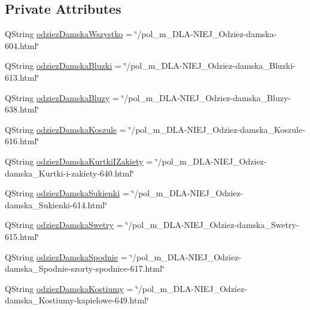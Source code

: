 \subsection*{Private Attributes}
\begin{DoxyCompactItemize}
\item 
Q\+String \mbox{\hyperlink{classdownload_product_af044eff03d0253442f16919758e3b9d8}{odziez\+Damska\+Wszystko}} = \char`\"{}/pol\+\_\+m\+\_\+\+D\+LA-\/N\+I\+E\+J\+\_\+\+Odziez-\/damska-\/604.html\char`\"{}
\item 
Q\+String \mbox{\hyperlink{classdownload_product_a42bef234920f4daa39ad5b69589f8de4}{odziez\+Damska\+Bluzki}} = \char`\"{}/pol\+\_\+m\+\_\+\+D\+LA-\/N\+I\+E\+J\+\_\+\+Odziez-\/damska\+\_\+\+Bluzki-\/613.html\char`\"{}
\item 
Q\+String \mbox{\hyperlink{classdownload_product_a92a6dad967a568583490ff60825ab1da}{odziez\+Damska\+Bluzy}} = \char`\"{}/pol\+\_\+m\+\_\+\+D\+LA-\/N\+I\+E\+J\+\_\+\+Odziez-\/damska\+\_\+\+Bluzy-\/638.html\char`\"{}
\item 
Q\+String \mbox{\hyperlink{classdownload_product_ae0b925c7625632a8797d277013e62582}{odziez\+Damska\+Koszule}} = \char`\"{}/pol\+\_\+m\+\_\+\+D\+LA-\/N\+I\+E\+J\+\_\+\+Odziez-\/damska\+\_\+\+Koszule-\/616.html\char`\"{}
\item 
Q\+String \mbox{\hyperlink{classdownload_product_ab108a4adb7e4dd8f0c39209ef836054a}{odziez\+Damska\+Kurtki\+I\+Zakiety}} = \char`\"{}/pol\+\_\+m\+\_\+\+D\+LA-\/N\+I\+E\+J\+\_\+\+Odziez-\/damska\+\_\+\+Kurtki-\/i-\/zakiety-\/640.html\char`\"{}
\item 
Q\+String \mbox{\hyperlink{classdownload_product_a30d5827520c765ec3bad4449bcf132c3}{odziez\+Damska\+Sukienki}} = \char`\"{}/pol\+\_\+m\+\_\+\+D\+LA-\/N\+I\+E\+J\+\_\+\+Odziez-\/damska\+\_\+\+Sukienki-\/614.html\char`\"{}
\item 
Q\+String \mbox{\hyperlink{classdownload_product_a8ba9fa034caea2d860991d1ea4e19c7c}{odziez\+Damska\+Swetry}} = \char`\"{}/pol\+\_\+m\+\_\+\+D\+LA-\/N\+I\+E\+J\+\_\+\+Odziez-\/damska\+\_\+\+Swetry-\/615.html\char`\"{}
\item 
Q\+String \mbox{\hyperlink{classdownload_product_a0a42e271c16eca3a7031ca395fd30209}{odziez\+Damska\+Spodnie}} = \char`\"{}/pol\+\_\+m\+\_\+\+D\+LA-\/N\+I\+E\+J\+\_\+\+Odziez-\/damska\+\_\+\+Spodnie-\/szorty-\/spodnice-\/617.html\char`\"{}
\item 
Q\+String \mbox{\hyperlink{classdownload_product_aae6176dbd63022a0277f9aae5bc2f8ff}{odziez\+Damska\+Kostiumy}} = \char`\"{}/pol\+\_\+m\+\_\+\+D\+LA-\/N\+I\+E\+J\+\_\+\+Odziez-\/damska\+\_\+\+Kostiumy-\/kapielowe-\/649.html\char`\"{}

\end{DoxyCompactItemize}
